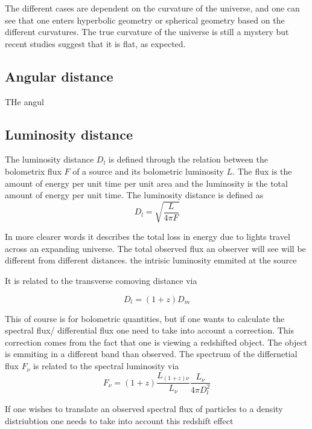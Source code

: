 \documentclass{article}
\begin{document}
The different cases are dependent on the curvature of the universe, and one can see that one enters hyperbolic geometry or spherical geometry based on the different curvatures. The true curvature of the universe is still a mystery but recent studies suggest that it is flat, as expected. 


\subsection{Angular distance}


THe angul


\subsection{Luminosity distance}
The luminosity distance $D_l$ is defined through the relation between 
the bolometrix flux $F$ of a source and its bolometric luminosity $L$. 
The flux is the amount of energy per unit time per unit area and the luminosity is the total amount of energy per unit time. 
The luminosity distance is defined as
\begin{equation}
    D_l = \sqrt{\frac{L}{4\pi F}}
\end{equation}

In more clearer words it describes the total loss in energy due to lights travel across an expanding universe. 
The total observed flux an observer will see will be different from different distances.  the intrisic luminosity emmited at the source




It is related to the transverse comoving distance via 

\begin{equation}
    D_l = (1+z)D_m
\end{equation}

This of course is for bolometric quantities, but if one wants to calculate the spectral 
flux/ differential flux one need to take into account a correction. This correction comes 
from the fact that one is viewing a redshifted object. The object is emmiting in a different band than 
observed. The spectrum of the differnetial flux $F_\nu$ is related to the spectral luminosity via
\begin{equation}
    F_\nu = (1+z) \frac{L_{(1+z)\nu}}{L_\nu}\frac{L_\nu}{4\pi D_l^2}
\end{equation}

If one wishes to translate an observed spectral flux of particles to a density distriubtion one needs to take into account this redshift effect
\end{document}
